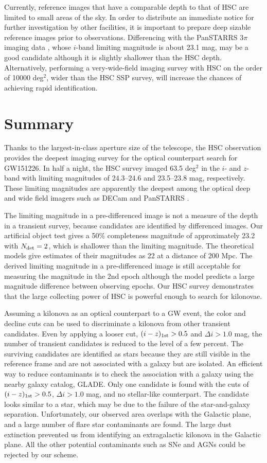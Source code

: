 \documentclass[]{pasj01}
\begin{document}
Currently,  reference images that have a comparable depth to that of HSC are limited to small areas of the sky.
In order to distribute an immediate notice for further investigation by other facilities, 
it is important to prepare deep sizable reference images prior to  observations.
Differencing with the PanSTARRS $3\pi$ imaging data \citep{2016arXiv161205560C},
whose $i$-band limiting magnitude is about 23.1 mag, may be a good candidate
although it is slightly shallower than the HSC depth. 
Alternatively, performing a very-wide-field imaging survey with HSC on the order of 10000 deg$^2$,
wider than the HSC SSP survey, will increase the chances of achieving rapid identification.

\section{Summary}
Thanks to the largest-in-class aperture size of the telescope,
the HSC observation provides the deepest imaging survey for the optical counterpart search for GW151226.
In half a night, the HSC survey imaged 63.5 deg$^2$ in the $i$- and $z$-band with limiting magnitudes of 24.3--24.6 and 23.5--23.8 mag, respectively.
These limiting magnitudes are apparently the deepest among the optical deep and wide field imagers such as 
DECam \citep{2016ApJ...826L..29C} and PanSTARRS \citep{2016ApJ...827L..40S}.

The limiting magnitude in a pre-differenced image is not a measure of the depth in a transient survey,
because candidates are identified by differenced images.
Our artificial object test gives a 50\% completeness magnitude of approximately 23.2  with $N_{\rm det}=2$, which is shallower than the limiting magnitude.
The theoretical models give estimates of their magnitudes as 22 at a distance of 200 Mpc.
The derived limiting magnitude in a pre-differenced image is still acceptable for measuring the magnitude in the 2nd epoch
although the model predicts a large magnitude difference between observing epochs.
Our HSC survey demonstrates that the large collecting power of HSC is powerful enough to search for  kilonovae.

Assuming a kilonova as an optical counterpart to a GW event,
the color and decline cuts can be used to discriminate a kilonova from other transient candidates.
Even by applying a looser cut, $(i-z)_{\rm 1st}>0.5$ and $\Delta i>1.0$ mag,
the number of transient candidates is reduced to the level of a few percent.
The surviving candidates are identified as stars because they are still visible in the reference frame and are not associated with a galaxy but are isolated.
An efficient way to reduce contaminants is to check the association with a galaxy using the nearby galaxy catalog, GLADE.
Only one candidate is found with the cuts of $(i-z)_{\rm 1st}>0.5$, $\Delta i>1.0$ mag, and no stellar-like counterpart.
The candidate looks similar to a star, which may be due to the failure of the star-and-galaxy separation.
Unfortunately, our observed area overlaps with the Galactic plane, and a large number of flare star contaminants are found.
The large dust extinction prevented us from identifying an extragalactic  kilonova in the Galactic plane.
All the other potential contaminants such as SNe and AGNs could be rejected by our scheme.
\end{document}
